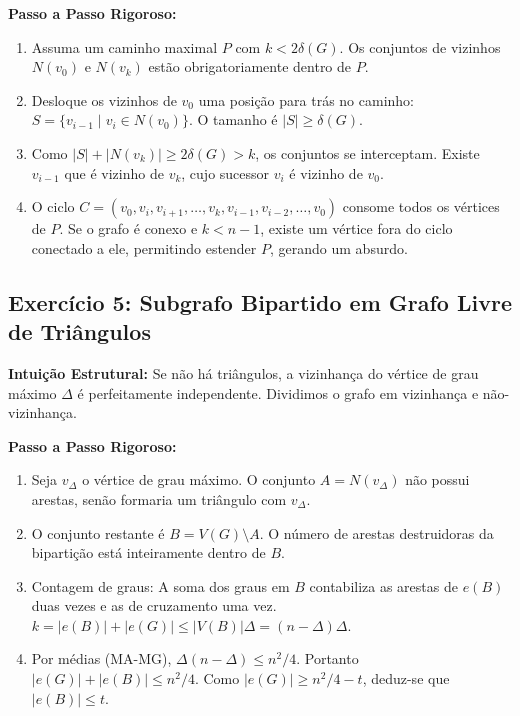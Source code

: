 \documentclass[11pt, a4paper]{article}
\begin{document}
\textbf{Passo a Passo Rigoroso:}
\begin{enumerate}
    \item Assuma um caminho maximal $P$ com $k < 2\delta(G)$. Os conjuntos de vizinhos $N(v_0)$ e $N(v_k)$ estão obrigatoriamente dentro de $P$.
    \item Desloque os vizinhos de $v_0$ uma posição para trás no caminho: $S = \{v_{i-1} \mid v_i \in N(v_0)\}$. O tamanho é $|S| \ge \delta(G)$.
    \item Como $|S| + |N(v_k)| \ge 2\delta(G) > k$, os conjuntos se interceptam. Existe $v_{i-1}$ que é vizinho de $v_k$, cujo sucessor $v_i$ é vizinho de $v_0$.
    \item O ciclo $C = (v_0, v_i, v_{i+1}, \dots, v_k, v_{i-1}, v_{i-2}, \dots, v_0)$ consome todos os vértices de $P$. Se o grafo é conexo e $k < n-1$, existe um vértice fora do ciclo conectado a ele, permitindo estender $P$, gerando um absurdo.
\end{enumerate}

\subsection*{Exercício 5: Subgrafo Bipartido em Grafo Livre de Triângulos}
\textbf{Intuição Estrutural:} Se não há triângulos, a vizinhança do vértice de grau máximo $\Delta$ é perfeitamente independente. Dividimos o grafo em vizinhança e não-vizinhança.

\textbf{Passo a Passo Rigoroso:}
\begin{enumerate}
    \item Seja $v_{\Delta}$ o vértice de grau máximo. O conjunto $A = N(v_{\Delta})$ não possui arestas, senão formaria um triângulo com $v_{\Delta}$.
    \item O conjunto restante é $B = V(G) \setminus A$. O número de arestas destruidoras da bipartição está inteiramente dentro de $B$.
    \item Contagem de graus: A soma dos graus em $B$ contabiliza as arestas de $e(B)$ duas vezes e as de cruzamento uma vez. $k = |e(B)| + |e(G)| \le |V(B)|\Delta = (n-\Delta)\Delta$.
    \item Por médias (MA-MG), $\Delta(n-\Delta) \le n^2/4$. Portanto $|e(G)| + |e(B)| \le n^2/4$. Como $|e(G)| \ge n^2/4 - t$, deduz-se que $|e(B)| \le t$.
\end{enumerate}

\end{document}
